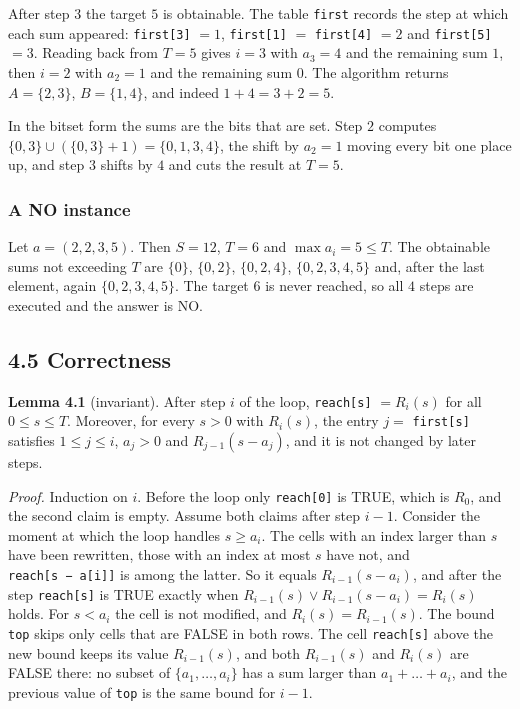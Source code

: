 \documentclass[
]{article}
\begin{document}
After step \(3\) the target \(5\) is obtainable. The table
\texttt{first} records the step at which each sum appeared:
\texttt{first{[}3{]}} \(= 1\), \texttt{first{[}1{]}} \(=\)
\texttt{first{[}4{]}} \(= 2\) and \texttt{first{[}5{]}} \(= 3\). Reading
back from \(T = 5\) gives \(i = 3\) with \(a_3 = 4\) and the remaining
sum \(1\), then \(i = 2\) with \(a_2 = 1\) and the remaining sum \(0\).
The algorithm returns \(A = \lbrace 2, 3 \rbrace\),
\(B = \lbrace 1, 4 \rbrace\), and indeed \(1 + 4 = 3 + 2 = 5\).

In the bitset form the sums are the bits that are set. Step \(2\)
computes
\(\lbrace 0, 3 \rbrace \cup (\lbrace 0, 3 \rbrace + 1) = \lbrace 0, 1, 3, 4 \rbrace\),
the shift by \(a_2 = 1\) moving every bit one place up, and step \(3\)
shifts by \(4\) and cuts the result at \(T = 5\).

\hypertarget{a-no-instance-2}{%
\subsubsection{A NO instance}\label{a-no-instance-2}}

Let \(a = (2, 2, 3, 5)\). Then \(S = 12\), \(T = 6\) and
\(\max a_i = 5 \le T\). The obtainable sums not exceeding \(T\) are
\(\lbrace 0 \rbrace\), \(\lbrace 0, 2 \rbrace\),
\(\lbrace 0, 2, 4 \rbrace\), \(\lbrace 0, 2, 3, 4, 5 \rbrace\) and,
after the last element, again \(\lbrace 0, 2, 3, 4, 5 \rbrace\). The
target \(6\) is never reached, so all \(4\) steps are executed and the
answer is NO.

\hypertarget{correctness-2}{%
\subsection{4.5 Correctness}\label{correctness-2}}

\textbf{Lemma 4.1} (invariant). After step \(i\) of the loop,
\texttt{reach{[}s{]}} \(= R_i(s)\) for all \(0 \le s \le T\). Moreover,
for every \(s > 0\) with \(R_i(s)\), the entry \(j =\)
\texttt{first{[}s{]}} satisfies \(1 \le j \le i\), \(a_j > 0\) and
\(R_{j-1}(s - a_j)\), and it is not changed by later steps.

\emph{Proof.} Induction on \(i\). Before the loop only
\texttt{reach{[}0{]}} is TRUE, which is \(R_0\), and the second claim is
empty. Assume both claims after step \(i - 1\). Consider the moment at
which the loop handles \(s \ge a_i\). The cells with an index larger
than \(s\) have been rewritten, those with an index at most \(s\) have
not, and \texttt{reach{[}s\ −\ a{[}i{]}{]}} is among the latter. So it
equals \(R_{i-1}(s - a_i)\), and after the step \texttt{reach{[}s{]}} is
TRUE exactly when \(R_{i-1}(s) \lor R_{i-1}(s - a_i) = R_i(s)\) holds.
For \(s < a_i\) the cell is not modified, and \(R_i(s) = R_{i-1}(s)\).
The bound \texttt{top} skips only cells that are FALSE in both rows. The
cell \texttt{reach{[}s{]}} above the new bound keeps its value
\(R_{i-1}(s)\), and both \(R_{i-1}(s)\) and \(R_i(s)\) are FALSE there:
no subset of \(\lbrace a_1, \dots, a_i \rbrace\) has a sum larger than
\(a_1 + \dots + a_i\), and the previous value of \texttt{top} is the
same bound for \(i - 1\).
\end{document}
